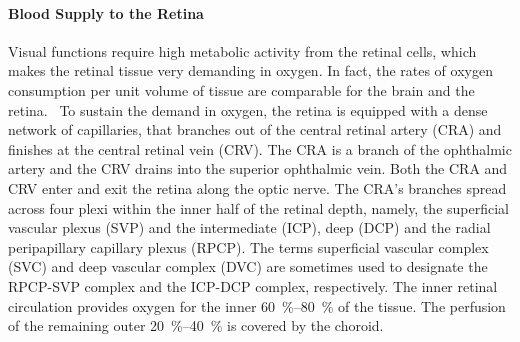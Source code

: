 \documentclass[12pt,a4paper]{journal}
\begin{document}
\paragraph*{Blood Supply to the Retina}

Visual functions require high metabolic activity from the retinal cells, which makes the retinal tissue very demanding in oxygen.
In fact, the rates of oxygen consumption per unit volume of tissue are comparable for the brain and the retina.~\cite{Medrano_1995}
To sustain the demand in oxygen, the retina is equipped with a dense network of capillaries, that branches out of the central retinal artery (CRA) and finishes at the central retinal vein (CRV).
The CRA is a branch of the ophthalmic artery and the CRV drains into the superior ophthalmic vein.
Both the CRA and CRV enter and exit the retina along the optic nerve.
The CRA's branches spread across four plexi within the inner half of the retinal depth, namely, the superficial vascular plexus (SVP) and the intermediate (ICP), deep (DCP) and the radial peripapillary capillary plexus (RPCP).
The terms superficial vascular complex (SVC) and deep vascular complex (DVC) are sometimes used to designate the RPCP-SVP complex and the ICP-DCP complex, respectively.
The inner retinal circulation provides oxygen for the inner \SIrange{60}{80}{\percent} of the tissue.
The perfusion of the remaining outer \SIrange{20}{40}{\percent} is covered by the choroid.
\end{document}
